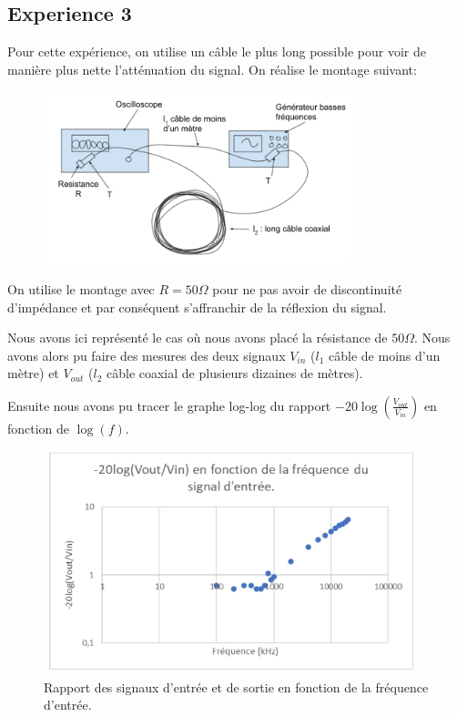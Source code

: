 \documentclass[12pt,a4paper, french]{article}
\begin{document}
    \newpage
    \subsection{Experience 3}
    
    Pour cette expérience, on utilise un câble le plus long possible pour
     voir de manière plus nette l’atténuation du signal. On réalise le montage suivant:
     \begin{figure}[!h]
        \begin{center}
                \includegraphics[width=9cm,height=5cm]{schemaexp3.png}
        \end{center}
        \end{figure}
    
    On utilise le montage avec $R=50\Omega $ pour ne pas avoir de discontinuité d’impédance et par conséquent 
    s’affranchir de la réflexion du signal. 
    
    Nous avons ici représenté le cas où nous avons placé la résistance de $50\Omega $.
    Nous avons alors pu faire des mesures des deux signaux $V_{in}$ ($l_1$ câble de moins d’un mètre) et
    $V_{out}$ ($l_2$ câble coaxial de plusieurs dizaines de mètres).
    
    Ensuite nous avons pu tracer le graphe log-log du rapport 
    $-20\log(\frac{V_{out}}{V_{in}})$ en fonction de $\log(f)$.
    \begin{figure}[!h]
        \begin{center}
                \includegraphics[width=11cm,height=6.5cm]{graphexp3.png}
                \caption{Rapport des signaux d'entrée et de sortie en fonction de la fréquence d'entrée.}
        \end{center}
        \end{figure}
    
\end{document}
